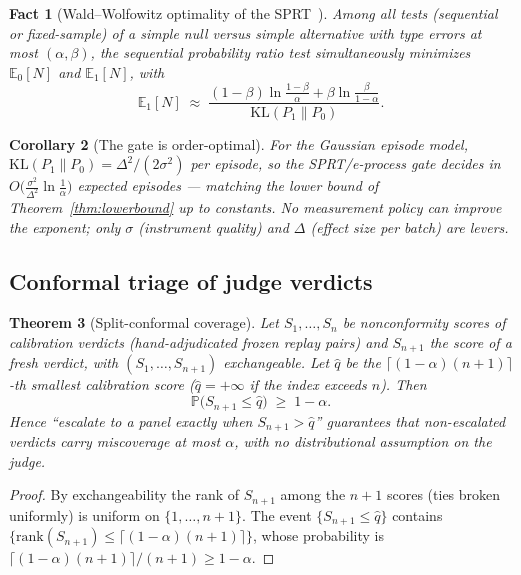 \documentclass[11pt]{article}
\theoremstyle{plain}
\newtheorem{theorem}{Theorem}[section]
\newtheorem{corollary}[theorem]{Corollary}
\newtheorem{fact}[theorem]{Fact} %
\theoremstyle{definition}
\theoremstyle{remark}
\newcommand{\E}{\mathbb{E}}
\newcommand{\Prob}{\mathbb{P}}
\newcommand{\KL}{\mathrm{KL}}
\begin{document}
\begin{fact}[Wald--Wolfowitz optimality of the SPRT~\cite{wald48}]
\label{fact:wald}
Among all tests (sequential or fixed-sample) of a simple null versus simple
alternative with type errors at most $(\alpha, \beta)$, the sequential
probability ratio test simultaneously minimizes $\E_0[N]$ and $\E_1[N]$, with
\[
  \E_1[N] \;\approx\; \frac{(1-\beta)\ln\frac{1-\beta}{\alpha} +
  \beta \ln\frac{\beta}{1-\alpha}}{\KL(P_1 \| P_0)} .
\]
\end{fact}

\begin{corollary}[The gate is order-optimal]\label{cor:orderopt}
For the Gaussian episode model, $\KL(P_1 \| P_0) = \Delta^2 / (2\sigma^2)$
per episode, so the SPRT/e-process gate decides in
$O\!\bigl(\tfrac{\sigma^2}{\Delta^2} \ln \tfrac1\alpha\bigr)$ expected
episodes --- matching the lower bound of Theorem~\ref{thm:lowerbound} up to
constants. \emph{No measurement policy can improve the exponent; only
$\sigma$ (instrument quality) and $\Delta$ (effect size per batch) are
levers.}
\end{corollary}

\subsection{Conformal triage of judge verdicts}

\begin{theorem}[Split-conformal coverage]\label{thm:conformal}
Let $S_1, \dots, S_n$ be nonconformity scores of calibration verdicts
(hand-adjudicated frozen replay pairs) and $S_{n+1}$ the score of a fresh
verdict, with $(S_1, \dots, S_{n+1})$ exchangeable. Let $\hat q$ be the
$\lceil (1-\alpha)(n+1) \rceil$-th smallest calibration score ($\hat q =
+\infty$ if the index exceeds $n$). Then
\[
  \Prob\bigl( S_{n+1} \le \hat q \bigr) \;\ge\; 1 - \alpha .
\]
Hence ``escalate to a panel exactly when $S_{n+1} > \hat q$'' guarantees that
non-escalated verdicts carry miscoverage at most $\alpha$, with no
distributional assumption on the judge.
\end{theorem}

\begin{proof}
By exchangeability the rank of $S_{n+1}$ among the $n+1$ scores (ties broken
uniformly) is uniform on $\{1, \dots, n+1\}$. The event $\{S_{n+1} \le \hat
q\}$ contains $\{\mathrm{rank}(S_{n+1}) \le \lceil (1-\alpha)(n+1) \rceil\}$,
whose probability is $\lceil (1-\alpha)(n+1)\rceil / (n+1) \ge 1-\alpha$.
\end{proof}
\end{document}
